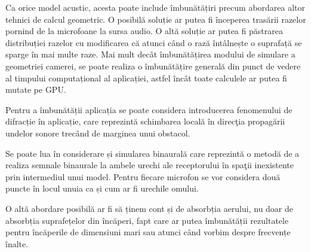 	Ca orice model acustic, acesta poate include îmbunătățiri precum abordarea altor tehnici de calcul geometric. O posibilă soluție ar putea fi începerea trasării razelor pornind de la microfoane la sursa audio. O altă soluție ar putea fi păstrarea distribuției razelor cu modificarea că atunci când o rază întâlnește o suprafață se sparge în mai multe raze. Mai mult decât îmbunătățirea modului de simulare a geometriei camerei, se poate realiza o  îmbunătățire generală din punct de vedere al timpului computațional al aplicației, astfel încât toate calculele ar putea fi mutate pe GPU.
	
	Pentru a îmbunătății aplicația se poate considera introducerea fenomenului de difracție în aplicație, care reprezint\u{a} schimbarea local\u{a} \^{i}n direc\c{t}ia propag\u{a}rii undelor sonore trec\^{a}nd de marginea unui obstacol.
	
	Se poate lua în considerare și simularea binaurală care reprezint\u{a} o metod\u{a} de a realiza semnale binaurale la ambele urechi ale receptorului \^{i}n spa\c{t}ii inexistente prin intermediul unui model. Pentru fiecare microfon se vor considera două puncte în locul unuia ca și cum ar fi urechile omului.
	
	O altă abordare posibilă ar fi să ținem cont și de absorbția aerului, nu doar de absorbția suprafețelor din încăperi, fapt care ar putea îmbunătății rezultatele pentru încăperile de dimensiuni mari sau atunci când vorbim despre frecvențe înalte. 
	
